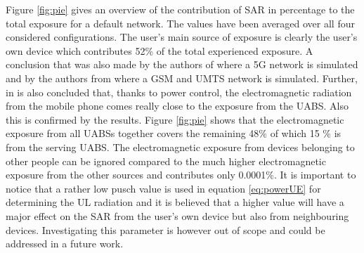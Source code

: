 Figure \ref{fig:pie} gives
an overview of the contribution of \gls{SAR} in percentage to the total 
exposure for a default network. The values have been averaged over all four considered configurations. 
The user's main source of exposure is clearly the user's own device which contributes 52\% of the total experienced exposure.
A conclusion that was also made by the authors of \cite{J17_kuehn2019modelling}
where a 5G network is simulated and by the authors from  \cite{J10.1.1} 
where a \gls{GSM} and \gls{UMTS} network is simulated. Further, in \cite{J10.1.1} is also concluded that,
thanks to power control, the electromagnetic radiation from the mobile phone 
comes really close to the exposure from the \gls{UABS}. 
Also this is confirmed by the results. Figure \ref{fig:pie} shows that the electromagnetic exposure 
from all \gls{UABS}s together covers the remaining 48\% of which 15 \% is from the serving UABS. 
The electromagnetic
 exposure from devices belonging to other people can be ignored compared to the much higher electromagnetic exposure from the other sources
 and contributes only 0.0001\%. It is important to notice that a rather low \gls{pusch} value is used in equation \ref{eq:powerUE} for determining the 
 \gls{UL} radiation and it is believed that a higher value will have a major effect on the \gls{SAR} from the user's own 
 device but also from neighbouring devices. Investigating this parameter is however out of scope and could be addressed in a future work.


